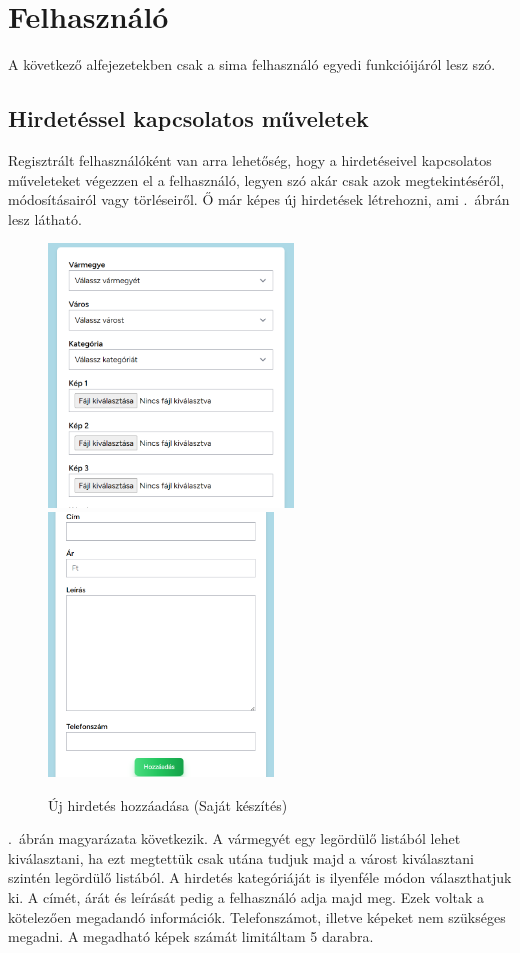 \documentclass[]{thesis-ekf}
\theoremstyle{definition}
\theoremstyle{remark}
\begin{document}
	\section{Felhasználó}
		A következő alfejezetekben csak a sima felhasználó egyedi funkcióijáról lesz szó.
	\subsection{Hirdetéssel kapcsolatos műveletek}
		Regisztrált felhasználóként van arra lehetőség, hogy a hirdetéseivel kapcsolatos műveleteket végezzen el a felhasználó, legyen szó akár csak azok megtekintéséről, módosításairól vagy törléseiről. Ő már képes új hirdetések létrehozni, ami .~ábrán lesz látható.
		\begin{figure}[ht!]
			\centering
			\includegraphics[height=7cm]{./felhasznaloi/hozzadas1}
			\includegraphics[height=7cm]{./felhasznaloi/hozzadas2}
			\caption{Új hirdetés hozzáadása (Saját készítés)} 
			\label{hirdetes-hozzadas-muvelet}
		\end{figure}
		.~ábrán magyarázata következik. A vármegyét egy legördülő listából lehet kiválasztani, ha ezt megtettük csak utána tudjuk majd a várost kiválasztani szintén legördülő listából. A hirdetés kategóriáját is ilyenféle módon választhatjuk ki. A címét, árát és leírását pedig a felhasználó adja majd meg. Ezek voltak a kötelezően megadandó információk. Telefonszámot, illetve képeket nem szükséges megadni. A megadható képek számát limitáltam 5 darabra.
\end{document}
